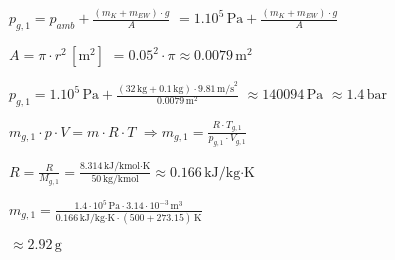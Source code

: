 \( p_{g,1} = p_{amb} + \frac{(m_K + m_{EW}) \cdot g}{A} \)  
\( = 1.10^5 \, \text{Pa} + \frac{(m_K + m_{EW}) \cdot g}{A} \)  

\( A = \pi \cdot r^2 \, [\text{m}^2] \)  
\( = 0.05^2 \cdot \pi \approx 0.0079 \, \text{m}^2 \)  

\( p_{g,1} = 1.10^5 \, \text{Pa} + \frac{(32 \, \text{kg} + 0.1 \, \text{kg}) \cdot 9.81 \, \text{m/s}^2}{0.0079 \, \text{m}^2} \)  
\( \approx 140094 \, \text{Pa} \)  
\( \approx 1.4 \, \text{bar} \)  

\( m_{g,1} \cdot p \cdot V = m \cdot R \cdot T \)  
\( \Rightarrow m_{g,1} = \frac{R \cdot T_{g,1}}{p_{g,1} \cdot V_{g,1}} \)  

\( R = \frac{R}{M_{g,1}} = \frac{8.314 \, \text{kJ/kmol·K}}{50 \, \text{kg/kmol}} \approx 0.166 \, \text{kJ/kg·K} \)  

\( m_{g,1} = \frac{1.4 \cdot 10^5 \, \text{Pa} \cdot 3.14 \cdot 10^{-3} \, \text{m}^3}{0.166 \, \text{kJ/kg·K} \cdot (500 + 273.15) \, \text{K}} \)  

\( \approx 2.92 \, \text{g} \)